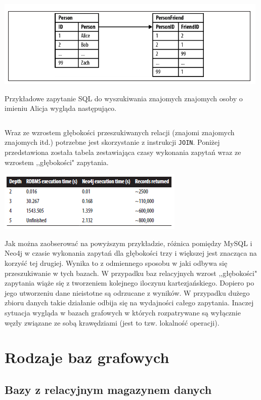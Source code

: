 \documentclass[brudnopis]{xmgr}
\begin{document}
\includegraphics[scale=0.75]{images/relational-schema-friends.png}

Przykładowe zapytanie SQL do wyszukiwania znajomych znajomych osoby o imieniu Alicja wygląda następująco.

\inputminted{sql}{listings/sql/relational-schema-friends-fof-query.sql}

Wraz ze wzrostem głębokości przeszukiwanych relacji (znajomi znajomych znajomych itd.) potrzebne jest skorzystanie z instrukcji \texttt{JOIN}. Poniżej przedstawiona została tabela zestawiająca czasy wykonania zapytań wraz ze wzrostem ,,głębokości" zapytania.

\includegraphics[scale=0.75]{images/relational-schema-friends-results.png}

Jak można zaobserować na powyższym przykładzie, różnica pomiędzy MySQL i Neo4j w czasie wykonania zapytań dla głębokości trzy i większej jest znacząca na korzyść tej drugiej. Wynika to z odmiennego sposobu w jaki odbywa się przeszukiwanie w tych bazach. W przypadku baz relacyjnych wzrost ,,głębokości" zapytania wiąże się z tworzeniem kolejnego iloczynu kartezjańskiego. Dopiero po jego utworzeniu dane nieistotne są odrzucane z wyników. W przypadku dużego zbioru danych takie działanie odbija się na wydajności całego zapytania. Inaczej sytuacja wygląda w bazach grafowych w których rozpatrywane są wyłącznie węzły związane ze sobą krawędziami (jest to tzw. lokalność operacji).

\section{Rodzaje baz grafowych}

\subsection{Bazy z relacyjnym magazynem danych}
\end{document}
